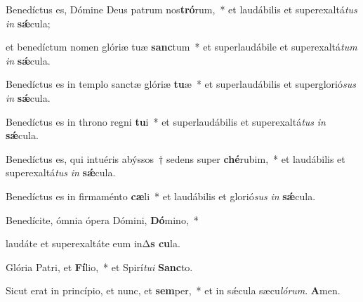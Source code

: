 \item Benedíctus es, Dómine Deus patrum nos\textbf{tró}rum,~* et laudábilis et superexaltá\textit{tus} \textit{in} \textbf{sǽ}cula;

\item et benedíctum nomen glóriæ tuæ \textbf{sanc}tum~* et superlaudábile et superexaltá\textit{tum} \textit{in} \textbf{sǽ}cula.

\item Benedíctus es in templo sanctæ glóriæ \textbf{tu}æ~* et superlaudábilis et superglorió\textit{sus} \textit{in} \textbf{sǽ}cula.

\item Benedíctus es in throno regni \textbf{tu}i~* et superlaudábilis et superexaltá\textit{tus} \textit{in} \textbf{sǽ}cula.

\item Benedíctus es, qui intuéris abýssos~† sedens super \textbf{ché}rubim,~* et laudábilis et superexaltá\textit{tus} \textit{in} \textbf{sǽ}cula.

\item Benedíctus es in firmaménto \textbf{cæ}li~* et laudábilis et glorió\textit{sus} \textit{in} \textbf{sǽ}cula.

\item Benedícite, ómnia ópera Dómini, \textbf{Dó}mino,~*

\item laudáte et superexaltáte eum inΔ\textbf{s cu}la.

\item Glória Patri, et \textbf{Fí}lio,~* et Spirí\textit{tu}\textit{i} \textbf{Sanc}to.

\item Sicut erat in princípio, et nunc, et \textbf{sem}per,~* et in sǽcula sæcu\textit{ló}\textit{rum}. \textbf{A}men.

